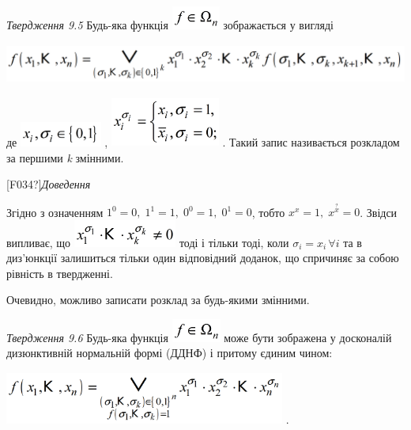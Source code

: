 \textit{Твердження 9.5 }\textit{ }Будь-яка функція 
\includegraphics[width=0.6244in,height=0.3016in]{crypt-img/crypt-img106.png} 
зображається у вигляді

{\centering
  \includegraphics[width=5.7354in,height=0.5189in]{crypt-img/crypt-img107.png} 
\par}

де  \includegraphics[width=1.0583in,height=0.3307in]{crypt-img/crypt-img108.png}
,  \includegraphics[width=1.4165in,height=0.6354in]{crypt-img/crypt-img109.png}
. Такий запис називається  розкладом за першими \textit{k}\textit{ }змінними.

\textlatin{[F034?]}\textit{Доведення} 

Згідно з означенням   ${1^{{0}}=0,\;1^{{1}}=1,\;0^{{0}}=1,\;0^{{1}}=0}$, тобто 
${x^{{x}}=1,\;x^{{\overset{{?}}{{x}}}}=0}$. Звідси випливає, що 
\includegraphics[width=1.339in,height=0.35in]{crypt-img/crypt-img110.png}  тоді
і тільки тоді, коли  ${\sigma _{{i}}=x_{{i\ }}\forall i}$ та в диз’юнкції
залишиться тільки один відповідний доданок, що спричиняє  за собою  рівність в
твердженні.

Очевидно, можливо записати розклад за будь-якими змінними.

\textit{Твердження 9.6}\textbf{  }Будь-яка функція 
\includegraphics[width=0.6354in,height=0.3016in]{crypt-img/crypt-img111.png} 
може бути зображена у досконалій диз{\textquotesingle}юнктивній нормальній
формі (ДДНФ) і притому єдиним чином:

{\centering
 \includegraphics[width=3.6366in,height=0.6807in]{crypt-img/crypt-img112.png} .
\par}

